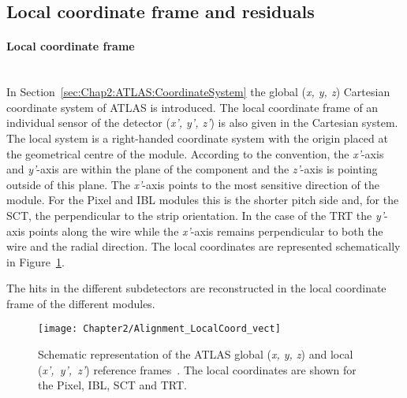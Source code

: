 \subsection{Local coordinate frame and residuals}
\paragraph{Local coordinate frame}\mbox{}\\
In Section~\ref{sec:Chap2:ATLAS:CoordinateSystem} the global (\textit{x, y, z}) Cartesian 
coordinate system of ATLAS is introduced. The local coordinate frame of an individual sensor
of the detector (\textit{x', y', z'}) is also given in the Cartesian system. The local system is a right-handed coordinate system
with the origin placed at the geometrical centre of the module. According to the convention,
the \textit{x'}-axis and \textit{y'}-axis are within the plane of the component and the \textit{z'}-axis
is pointing outside of this plane. The \textit{x'}-axis points to the most sensitive direction of the module. 
For the Pixel and IBL modules this is the shorter pitch side and, for the SCT, the perpendicular to the strip 
orientation. In the case of the TRT the \mbox{\textit{y'}-axis} points along the wire while the \textit{x'}-axis remains
perpendicular to both the wire and the radial direction. The local coordinates are represented schematically in 
Figure~\ref{fig:Chap2:Alignment:LocalCoordinate}.

The hits in the different subdetectors are reconstructed in the local coordinate frame of the different
modules. %

\begin{figure}
\centering
\texttt{[image: Chapter2/Alignment\_LocalCoord\_vect]}
\caption{Schematic representation of the ATLAS global (\textit{x, y, z}) and local \mbox{(\textit{x', y', z'})} 
reference frames~\cite{ATLAS:2020ixw}. The local coordinates are shown for the Pixel, IBL, SCT and TRT. }
\label{fig:Chap2:Alignment:LocalCoordinate}
\end{figure}

